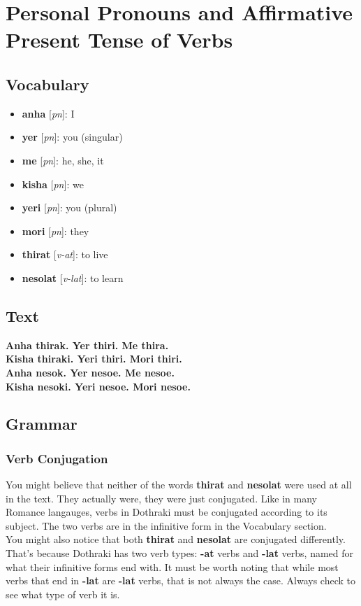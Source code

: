 \chapter{Personal Pronouns and Affirmative Present Tense of Verbs}
\section*{Vocabulary}
\begin{itemize}
	\item \textbf{anha} [\textit{pn}]: I
	\item \textbf{yer} [\textit{pn}]: you (singular)
	\item \textbf{me} [\textit{pn}]: he, she, it
	\item \textbf{kisha} [\textit{pn}]: we
	\item \textbf{yeri} [\textit{pn}]: you (plural)
	\item \textbf{mori} [\textit{pn}]: they
	\item \textbf{thirat} [\textit{v-at}]: to live
	\item \textbf{nesolat} [\textit{v-lat}]: to learn
\end{itemize}
\section*{Text}
	\textbf{Anha thirak. Yer thiri. Me thira.} \\
  \textbf{Kisha thiraki. Yeri thiri. Mori thiri.} \\
	\textbf{Anha nesok. Yer nesoe. Me nesoe.} \\
	\textbf{Kisha nesoki. Yeri nesoe. Mori nesoe.}
\section*{Grammar}
\subsection*{Verb Conjugation}
You might believe that neither of the words \textbf{thirat} and \textbf{nesolat}
were used at all in the text. They actually were, they were just conjugated.
Like in many Romance langauges, verbs in Dothraki must be conjugated according
to its subject. The two verbs are in the infinitive form in the Vocabulary section.\\
You might also notice that both \textbf{thirat} and \textbf{nesolat} are
conjugated differently. That's because Dothraki has two verb types: \textbf{-at}
verbs and \textbf{-lat} verbs, named for what their infinitive forms end with.
It must be worth noting that while most verbs that end in \textbf{-lat} are \textbf{-lat} verbs,
that is not always the case. Always check to see what type of verb it is.\\
